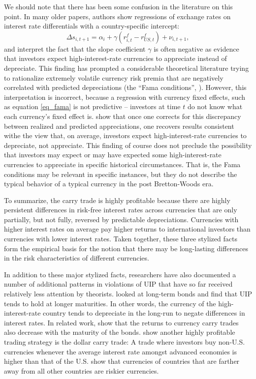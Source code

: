 \documentclass{ar-1col}
\begin{document}
We should note that there has been some confusion in the literature on this point. In many older papers, authors show regressions of exchange rates on interest rate differentials with a country-specific intercept:
\begin{equation}
    \Delta s_{i,t+1} 
    = \alpha_i + \gamma \left(r^f_{i, t} - r^f_{US, t}\right) + \nu_{i, t+1},
\label{eq_fama} 
\end{equation}
and interpret the fact that the slope coefficient $\gamma$ is often negative as evidence that investors expect high-interest-rate currencies to appreciate instead of depreciate. This finding has prompted a considerable theoretical literature trying to rationalize extremely volatile currency risk premia that are negatively correlated with predicted depreciations (the ``Fama conditions'', \citet{Backusetal2001}). However, this interpretation is incorrect, because a regression with currency fixed effects, such as equation \eqref{eq_fama} is not predictive -- investors at time $t$ do not know what each currency's fixed effect is. \citet{HassanMano2019} show that once one corrects for this discrepancy between realized and predicted appreciations, one recovers results consistent withe the view that, on average, investors expect high-interest-rate currencies to depreciate, not appreciate. This finding of course does not preclude the possibility that investors may expect or may have expected some high-interest-rate currencies to appreciate in specific historical circumstances. That is, the Fama conditions may be relevant in specific instances, but they do not describe the typical behavior of a typical currency in the post Bretton-Woods era.

To summarize, the carry trade is highly profitable because there are highly persistent differences in risk-free interest rates across currencies that are only partially, but not fully, reversed by predictable depreciations. Currencies with higher interest rates on average pay higher returns to international investors than currencies with lower interest rates. Taken together, these three stylized facts form the empirical basis for the notion that there may be long-lasting differences in the risk characteristics of different currencies.

In addition to these major stylized facts, researchers have also documented a number of additional patterns in violations of UIP that have so far received relatively less attention by theorists. \citet{ChinnMeredith2004} looked at long-term bonds and find that UIP tends to hold at longer maturities. In other words, the currency of the high-interest-rate country tends to depreciate in the long-run to negate differences in interest rates. In related work, \citet{LustigStathopoulosVerdelhan2019} show that the returns to currency carry trades also decrease with the maturity of the bonds. \citet{LRV2014} show another highly profitable trading strategy is the dollar carry trade: A trade where investors buy non-U.S. currencies whenever the average interest rate amongst advanced economies is higher than that of the U.S. \citet{LustigRichmond2020} show that currencies of countries that are farther away from all other countries are riskier currencies.
\end{document}
